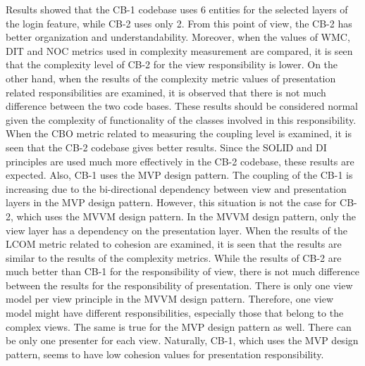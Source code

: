 Results showed that the CB-1 codebase uses 6 entities for the selected layers of the login feature, while CB-2 uses only 2. From this point of view, the CB-2 has better organization and understandability. Moreover, when the values of WMC, DIT and NOC metrics used in complexity measurement are compared, it is seen that the complexity level of CB-2 for the view responsibility is lower. On the other hand, when the results of the complexity metric values of presentation related responsibilities are examined, it is observed that there is not much difference between the two code bases. These results should be considered normal given the complexity of functionality of the classes involved in this responsibility. When the CBO metric related to measuring the coupling level is examined, it is seen that the CB-2 codebase gives better results. Since the SOLID and DI principles are used much more effectively in the CB-2 codebase, these results are expected. Also, CB-1 uses the MVP design pattern. The coupling of the CB-1 is increasing due to the bi-directional dependency between view and presentation layers in the MVP design pattern. However, this situation is not the case for CB-2, which uses the MVVM design pattern. In the MVVM design pattern, only the view layer has a dependency on the presentation layer. When the results of the LCOM metric related to cohesion are examined, it is seen that the results are similar to the results of the complexity metrics. While the results of CB-2 are much better than CB-1 for the responsibility of view, there is not much difference between the results for the responsibility of presentation. There is only one view model per view principle in the MVVM design pattern. Therefore, one view model might have different responsibilities, especially those that belong to the complex views. The same is true for the MVP design pattern as well. There can be only one presenter for each view. Naturally, CB-1, which uses the MVP design pattern, seems to have low cohesion values for presentation responsibility. 